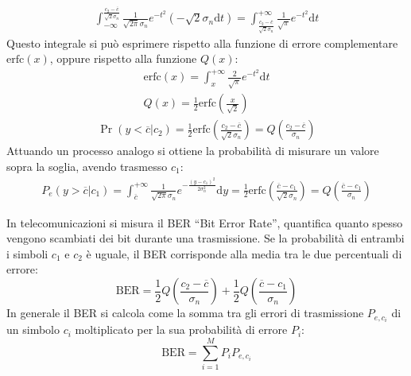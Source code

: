 \documentclass{article}
\newcommand{\df}{\mathrm{d}}
\numberwithin{equation}{subsection}
\begin{document}
\begin{gather*}
    \displaystyle\int_{-\infty}^{\frac{c_2-\overline{c}}{\sqrt2\sigma_n}}\frac{1}{\sqrt{2\pi}\sigma_n}e^{-t^2}\left(-\sqrt2\sigma_n\df t\right)=\int_{\frac{c_2-\overline{c}}{\sqrt2\sigma_n}}^{+\infty}\frac{1}{\sqrt\pi}e^{-t^2}\df t
\end{gather*}
Questo integrale si può esprimere rispetto alla funzione di errore complementare $\mathrm{erfc}(x)$, oppure rispetto alla funzione $Q(x)$:
\begin{gather}
    \mathrm{erfc}(x)=\displaystyle\int_{x}^{+\infty}\frac{2}{\sqrt\pi}e^{-t^2}{\df t}\\
    Q(x)=\displaystyle\frac{1}{2}\mathrm{erfc}\left(\frac{x}{\sqrt2}\right)
\end{gather}
\begin{gather*}
    \Pr(y<\overline{c}|c_2)=\displaystyle\frac{1}{2}\mathrm{erfc}\left(\frac{c_2-\overline{c}}{\sqrt{2}\sigma_n}\right)=Q\left(\frac{c_2-\overline{c}}{\sigma_n}\right)
\end{gather*}
Attuando un processo analogo si ottiene la probabilità di misurare un valore sopra la soglia, avendo trasmesso $c_1$:
\begin{gather*}
    P_e(y>\overline{c}|c_1)=\int_{\overline{c}}^{+\infty}\frac{1}{\sqrt{2\pi}\sigma_n}e^{-\frac{(y-c_1)^2}{2\sigma_n^2}}\df y=\frac{1}{2}\mathrm{erfc}\left(\frac{\overline{c}-c_1}{\sqrt{2}\sigma_n}\right)=Q\left(\frac{\overline{c}-c_1}{\sigma_n}\right)
\end{gather*}

In telecomunicazioni si misura il BER ``Bit Error Rate'', quantifica quanto spesso vengono scambiati dei bit durante una trasmissione. Se la probabilità di entrambi 
i simboli $c_1$ e $c_2$ è uguale, il BER corrisponde alla media tra le due percentuali di errore:
\begin{equation*}
    \mathrm{BER}=\displaystyle\frac{1}{2}Q\left(\frac{c_2-\overline{c}}{\sigma_n}\right)+\frac{1}{2}Q\left(\frac{\overline{c}-c_1}{\sigma_n}\right)
\end{equation*}
In generale il BER si calcola come la somma tra gli errori di trasmissione $P_{e,c_i}$ di un simbolo $c_i$ moltiplicato per la sua probabilità di errore $P_i$:
\begin{equation*}
    \mathrm{BER}=\displaystyle\sum_{i=1}^MP_{i}P_{e,c_i}
\end{equation*}
\end{document}
